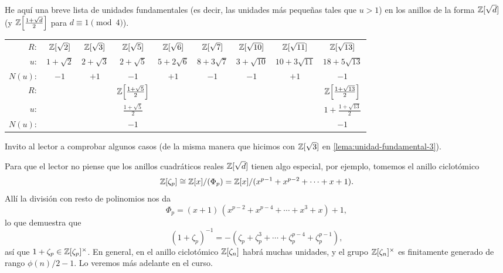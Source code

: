 \begin{ejemplo}
  He aquí una breve lista de unidades fundamentales (es decir, las unidades más
  pequeñas tales que $u > 1$) en los anillos de la forma $\mathbb{Z} [\sqrt{d}]$
  (y $\mathbb{Z} \Bigl[\frac{1+\sqrt{d}}{2}\Bigr]$ para $d \equiv 1 \pmod{4}$).

  \renewcommand{\arraystretch}{1.5}
  \begin{center}
    \begin{tabular}{rcccccccc}
      \hline
      $R\colon $ & $\mathbb{Z} [\sqrt{2}]$ & $\mathbb{Z} [\sqrt{3}]$ & $\mathbb{Z} [\sqrt{5}]$ & $\mathbb{Z} [\sqrt{6}]$ & $\mathbb{Z} [\sqrt{7}]$ & $\mathbb{Z} [\sqrt{10}]$ & $\mathbb{Z} [\sqrt{11}]$ & $\mathbb{Z} [\sqrt{13}]$ \\
      $u\colon$ & $1 + \sqrt{2}$ & $2 + \sqrt{3}$ & $2 + \sqrt{5}$ & $5 + 2\sqrt{6}$ & $8 + 3\sqrt{7}$ & $3 + \sqrt{10}$ & $10 + 3\sqrt{11}$ & $18 + 5\sqrt{13}$ \\
      $N (u)\colon$ & $-1$ & $+1$ & $-1$ & $+1$ & $-1$ & $-1$ & $+1$ & $-1$ \\
      \hline
      $R\colon $ & & & $\mathbb{Z} \Bigl[\frac{1+\sqrt{5}}{2}\Bigr]$ & & & & & $\mathbb{Z} \Bigl[\frac{1+\sqrt{13}}{2}\Bigr]$ \\
      $u\colon$ & & & $\frac{1+\sqrt{5}}{2}$ & & & & & $1 + \frac{1+\sqrt{13}}{2}$ \\
      $N (u)\colon$ & & & $-1$ & & & & & $-1$ \\
      \hline
    \end{tabular}
  \end{center}
  \renewcommand{\arraystretch}{1}

  Invito al lector a comprobar algunos casos (de la misma manera que hicimos con
  $\mathbb{Z} [\sqrt{3}]$ en \ref{lema:unidad-fundamental-3}).
\end{ejemplo}

Para que el lector no piense que los anillos cuadráticos reales $\mathbb{Z} [\sqrt{d}]$
tienen algo especial, por ejemplo, tomemos el anillo ciclotómico
$$\mathbb{Z}[\zeta_p] \cong \mathbb{Z}[x]/(\Phi_p) = \mathbb{Z}[x]/(x^{p-1} + x^{p-2} + \cdots + x + 1).$$
Allí la división con resto de polinomios nos da
$$\Phi_p = (x+1)\,(x^{p-2} + x^{p-4} + \cdots + x^3 + x) + 1,$$
lo que demuestra que
\[ (1 + \zeta_p)^{-1} =
   - (\zeta_p + \zeta_p^3 + \cdots + \zeta_p^{p-4} + \zeta_p^{p-1}), \]
así que $1 + \zeta_p \in \mathbb{Z} [\zeta_p]^\times$. En general, en el anillo
ciclotómico $\mathbb{Z}[\zeta_n]$ habrá muchas unidades, y el grupo
$\mathbb{Z}[\zeta_n]^\times$ es finitamente generado de rango $\phi(n)/2 - 1$.
Lo veremos más adelante en el curso.

